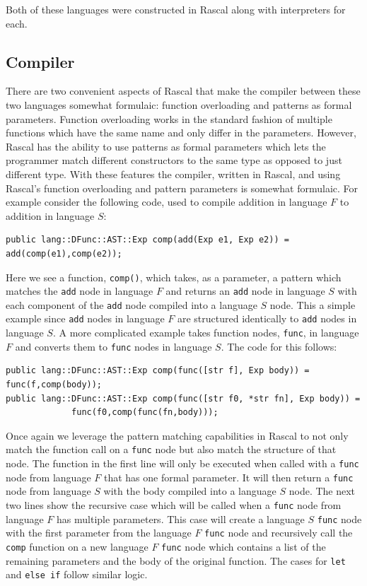 \documentclass[twoside]{article}
\begin{document}
Both of these languages were constructed in Rascal along with
interpreters for each. 

\subsection{Compiler}
There are two convenient aspects of Rascal that make the compiler
between these two languages somewhat formulaic: function overloading
and patterns as formal parameters. Function overloading works in the
standard fashion of multiple functions which have the same name and
only differ in the parameters. However, Rascal has the ability to use
patterns as formal parameters which lets the programmer match
different constructors to the same type as opposed to just different
type. With these features the compiler, written in Rascal, and using
Rascal's function overloading and pattern parameters is somewhat
formulaic. For example consider the following code, used to compile
addition in language $F$ to addition in language $S$:
\begin{lstlisting}
public lang::DFunc::AST::Exp comp(add(Exp e1, Exp e2)) = add(comp(e1),comp(e2));
\end{lstlisting}
Here we see a function, \texttt{comp()}, which takes, as a parameter, a
pattern which matches the \texttt{add} node in language $F$ and
returns an \texttt{add} node in language $S$ with each component of
the \texttt{add} node compiled into a language $S$ node. This a
simple example since \texttt{add} nodes in language $F$ are structured
identically to \texttt{add} nodes in language $S$. A more complicated
example takes function nodes, \texttt{func}, in language $F$ and
converts them to \texttt{func} nodes in language $S$. The code for
this follows:
\begin{lstlisting}
public lang::DFunc::AST::Exp comp(func([str f], Exp body)) = func(f,comp(body));
public lang::DFunc::AST::Exp comp(func([str f0, *str fn], Exp body)) =
             func(f0,comp(func(fn,body)));
\end{lstlisting}
Once again we leverage the pattern matching capabilities in Rascal to
not only match the function call on a \texttt{func} node but also
match the structure of that node. The function in the first line will
only be executed when called with a \texttt{func} node from language
$F$ that has one formal parameter. It will then return a \texttt{func}
node from language $S$ with the body compiled into a language $S$
node. The next two lines show the recursive case which will be called
when a \texttt{func} node from language $F$ has multiple
parameters. This case will create a language $S$ \texttt{func} node
with the first parameter from the language $F$ \texttt{func} node and
recursively call the \texttt{comp} function on a new language $F$
\texttt{func} node which contains a list of the remaining parameters
and the body of the original function. The cases for \texttt{let} and
\texttt{else if} follow similar logic.
\end{document}

